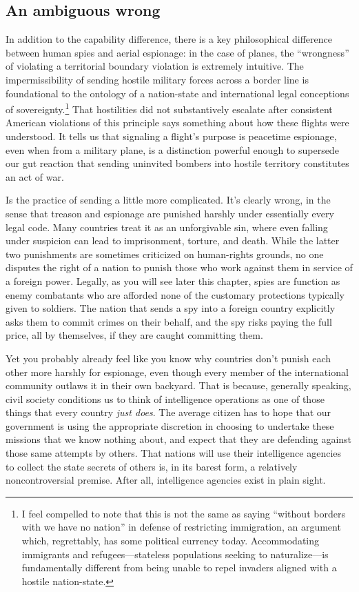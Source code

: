 \documentclass{memoir}
\begin{document}
\begin{refsegment}
\subsection{An ambiguous wrong}
In addition to the capability difference, there is a key philosophical difference between human spies and aerial espionage: in the case of planes, the ``wrongness'' of violating a territorial boundary violation is extremely intuitive. The impermissibility of sending hostile military forces across a border line is foundational to the ontology of a nation-state and international legal conceptions of sovereignty.\footnote{I feel compelled to note that this is not the same as saying ``without borders with we have no nation'' in defense of restricting immigration, an argument which, regrettably, has some political currency today. Accommodating immigrants and refugees---stateless populations seeking to naturalize---is fundamentally different from being unable to repel invaders aligned with a hostile nation-state.} That hostilities did not substantively escalate after consistent American violations of this principle says something about how these flights were understood. It tells us that signaling a flight's purpose is peacetime espionage, even when from a military plane, is a distinction powerful enough to supersede our gut reaction that sending uninvited bombers into hostile territory constitutes an act of war.

Is the practice of sending a little more complicated. It's clearly wrong, in the sense that treason and espionage are punished harshly under essentially every legal code. Many countries treat it as an unforgivable sin, where even falling under suspicion can lead to imprisonment, torture, and death. While the latter two punishments are sometimes criticized on human-rights grounds, no one disputes the right of a nation to punish those who work against them in service of a foreign power. Legally, as you will see later this chapter, spies are function as enemy combatants who are afforded none of the customary protections typically given to soldiers. The nation that sends a spy into a foreign country explicitly asks them to commit crimes on their behalf, and the spy risks paying the full price, all by themselves, if they are caught committing them.

Yet you probably already feel like you know why countries don't punish each other more harshly for espionage, even though every member of the international community outlaws it in their own backyard. That is because, generally speaking, civil society conditions us to think of intelligence operations as one of those things that every country \emph{just does}. The average citizen has to hope that our government is using the appropriate discretion in choosing to undertake these missions that we know nothing about, and expect that they are defending against those same attempts by others. That nations will use their intelligence agencies to collect the state secrets of others is, in its barest form, a relatively noncontroversial premise. After all, intelligence agencies exist in plain sight.


\end{refsegment}
\end{document}
